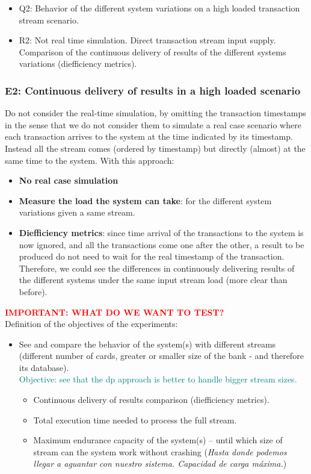 \documentclass[12pt,a4paper]{article}
\begin{document}
\begin{itemize}
  \item Q2: Behavior of the different system variations on a high loaded transaction stream scenario.
  \item R2: Not real time simulation. Direct transaction stream input supply. Comparison of the continuous delivery of results of the different systems variations (diefficiency metrics).
\end{itemize}

\subsubsection{E2: Continuous delivery of results in a high loaded scenario}

Do not consider the real-time simulation, by omitting the transaction timestamps in the sense that we do not consider them to simulate a real case scenario where each transaction arrives to the system at the time indicated by its timestamp. 
Instead all the stream comes (ordered by timestamp) but directly (almost) at the same time to the system. With this approach:
\begin{itemize}
  \item \textbf{No real case simulation}
  \item \textbf{Measure the load the system can take}: for the different system variations given a same stream.
  \item \textbf{Diefficiency metrics}: since time arrival of the transactions to the system is now ignored, and all the transactions come one after the other, a result to be produced do not need to wait for the real timestamp of the transaction. Therefore, we could see the differences in continuously delivering results of the different systems under the same input stream load (more clear than before).
\end{itemize}

\begin{tcolorbox}[colframe=red!75]
\textcolor{red}{\textbf{IMPORTANT: WHAT DO WE WANT TO TEST?\\}}
Definition of the objectives of the experiments:
\begin{itemize}
    \item See and compare the behavior of the system(s) with different streams (different number of cards, greater or smaller size of the bank - and therefore its database). \\
    \textcolor{teal}{Objective: see that the dp approach is better to handle bigger stream sizes.}
    \begin{itemize}
        \item Continuous delivery of results comparison (diefficiency metrics).
        \item Total execution time needed to process the full stream.
        \item Maximum endurance capacity of the system(s) -- until which size of stream can the system work without crashing (\textit{Hasta donde podemos llegar a aguantar con nuestro sistema. Capacidad de carga máxima.})
    \end{itemize}
\end{itemize}
\end{tcolorbox}
\end{document}
